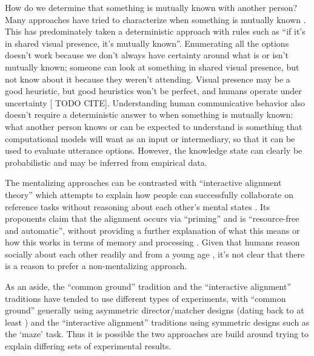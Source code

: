 \documentclass[]{article}
\begin{document}
How do we determine that something is mutually known with another person? Many approaches have tried to characterize when something is mutually known \citep{horton1996,clark1996, brown-schmidt2012}. This has predominately taken a deterministic approach with rules such as ``if it's in shared visual presence, it's mutually known''. Enumerating all the options doesn't work because we don't always have certainty around what is or isn't mutually known; someone can look at something in shared visual presence, but not know about it because they weren't attending. Visual presence may be a good heuristic, but good heuristics won't be perfect, and humans operate under uncertainty [ TODO CITE]. Understanding human communicative behavior also doesn't require a deterministic answer to when something is mutually known: what another person knows or can be expected to understand is something that computational models will want as an input or intermediary, so that it can be used to evaluate utterance options. However, the knowledge state can clearly be probabilistic and may be inferred from empirical data. 




The mentalizing approaches can be contrasted with ``interactive alignment theory'' which attempts to explain how people can successfully collaborate on reference tasks without reasoning about each other's mental states \citep{pickering2004, gandolfi2022}. Its proponents claim that the alignment occurs via ``priming'' and is ``resource-free and automatic'', without providing a further explanation of what this means or how this works in terms of memory and processing \citep{pickering2004}.  Given that humans reason socially about each other readily and from a young age \citep{rakoczy2022}, it's not clear that there is a reason to prefer a non-mentalizing approach. 

As an aside, the ``common ground'' tradition and the ``interactive alignment'' traditions have tended to use different types of experiments, with ``common ground'' generally using asymmetric director/matcher designs (dating back to at least \citet{krauss1966}) and the ``interactive alignment'' traditions using symmetric designs such as the `maze' task. Thus it is possible the two approaches are build around trying to explain differing sets of experimental results. 
\end{document}
